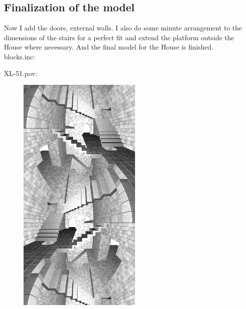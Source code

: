 \documentclass[12pt, a4paper]{article}
\begin{document}
\subsection{Finalization of the model}

Now I add the doors, external walls. I also do some minute arrangement to the dimensions of the stairs for a perfect fit and extend the platform outside the House where necessary. And the final model for the House is finished.\\

blocks.inc:\\
\begin{scriptsize}
\begin{ttfamily}

\end{ttfamily}
\end{scriptsize}

XL-51.pov:\\
\begin{scriptsize}
\begin{ttfamily}

\end{ttfamily}
\end{scriptsize}

\begin{center}
\begin{figure}[H]
\centering
\includegraphics[width=6cm]{./XL-51_13.png}\\
\end{figure}
\end{center}
\end{document}
